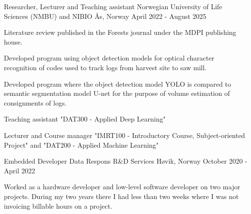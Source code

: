 \begin{cventries}
    \cventry
        {Researcher, Lecturer and Teaching assistant}
        {Norwegian University of Life Sciences (NMBU) and NIBIO}
        {Ås, Norway}
        {April 2022 - August 2025}
        {
            \begin{cvitems}
                \item {Literature review published in the Forests journal under the MDPI publishing house.}
                \item {Developed program using object detection models for optical character recognition of codes used to track logs from harvest site to saw mill.}
                \item {Developed program where the object detection model YOLO is compared to semantic segmentation model U-net for the purpose of volume estimation of consignments of logs.} %
                \item {Teaching assistant "DAT300 - Applied Deep Learning"}
                \item {Lecturer and Course manager "IMRT100 - Introductory Course, Subject-oriented Project" and  "DAT200 - Applied Machine Learning"}
            \end{cvitems}
        }
    \cventry
        {Embedded Developer}
        {Data Respons R\&D Services}
        {Høvik, Norway}
        {October 2020 - April 2022}
        {      
          \begin{cvitems}
            \item {Worked as a hardware developer and low-level software developer on two major projects. During my two years there I had less than two weeks where I was not invoicing billable hours on a project.}

\end{cvitems}}
\end{cventries}
